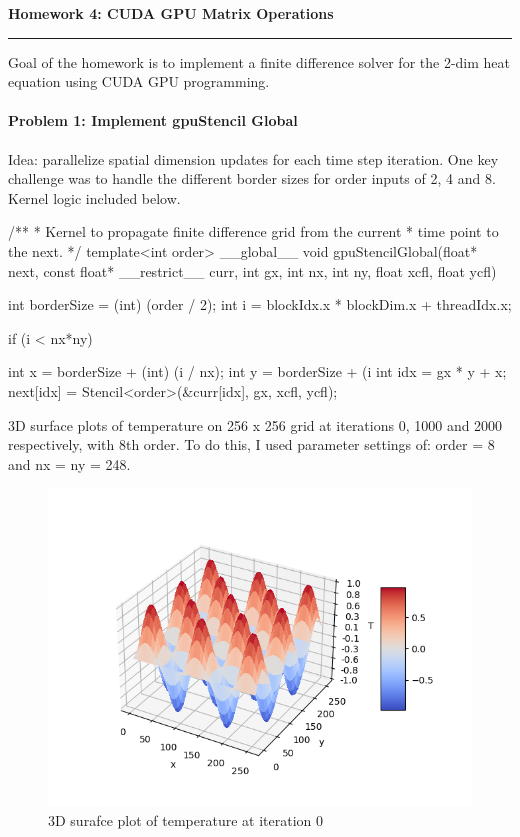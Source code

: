 \documentclass[12pt,letterpaper,twoside]{article}
\begin{document}
{\centering \textbf{Homework 4: CUDA GPU Matrix Operations\\}}
\vspace*{-8pt}\noindent\rule{\linewidth}{1pt}

Goal of the homework is to implement a finite difference solver for the
2-dim heat equation using CUDA GPU programming.

\paragraph{Problem 1: Implement gpuStencil Global } Idea: parallelize spatial
dimension updates for each time step iteration. One key challenge was to handle
the different border sizes for order inputs of 2, 4 and 8. Kernel logic included
below.

\begin{cpp}
/**
 * Kernel to propagate finite difference grid from the current
 * time point to the next.
 */
template<int order>
__global__
void gpuStencilGlobal(float* next, const float* __restrict__ curr, 
                      int gx, int nx, int ny, float xcfl, float ycfl) {
    
    int borderSize = (int) (order / 2);
    int i = blockIdx.x * blockDim.x + threadIdx.x;
   
    if (i < nx*ny) {
	int x = borderSize + (int) (i / nx);
	int y = borderSize + (i %
        int idx = gx * y + x;   
        next[idx] = Stencil<order>(&curr[idx], gx, xcfl, ycfl);
    
    }
}
\end{cpp}

3D surface plots of temperature on 256 x 256 grid at iterations 0, 1000 and 
2000 respectively, with 8th order. To do this, I used parameter settings of:
order = 8 and nx = ny = 248.

\begin{figure}[h]
    \center
    \includegraphics[scale=0.7]{global0000.png}
    \caption{3D surafce plot of temperature at iteration 0}
\end{figure}
\end{document}
